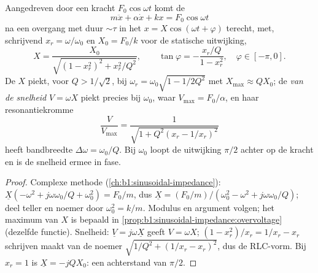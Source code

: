 \begin{theorem}\label{thm:b1:oscillators-resonance:forced}
Aangedreven door een kracht $F_0\cos\omega t$ komt de 
\[
m\ddot x + \alpha\dot x + kx = F_0\cos\omega t
\]
na een overgang met duur $\sim\tau$ in het  $x = X\cos(\omega t + \varphi)$ terecht, met, schrijvend $x_r = \omega/\omega_0$
en $X_0 = F_0/k$ voor de statische uitwijking,
\[
X = \frac{X_0}{\sqrt{(1 - x_r^2)^2 + x_r^2/Q^2}}, \qquad
\tan\varphi = -\frac{x_r/Q}{1 - x_r^2}, \quad \varphi \in [-\pi, 0] .
\]
De \emph{} $X$ piekt, voor $Q > 1/\sqrt2$, bij $\omega_r =
\omega_0\sqrt{1 - 1/2Q^2}$ met $X_{\max} \approx QX_0$; de \emph{ van de
snelheid} $V = \omega X$ piekt precies bij $\omega_0$, waar $V_{\max} =
F_0/\alpha$, en haar resonantiekromme
\[
\frac{V}{V_{\max}} = \frac{1}{\sqrt{1 + Q^2(x_r - 1/x_r)^2}}
\]
heeft bandbreedte $\Delta\omega = \omega_0/Q$. Bij $\omega_0$ loopt de uitwijking
$\pi/2$ achter op de kracht en is de snelheid ermee in fase.
\end{theorem}

\begin{proof}
Complexe methode (\cref{ch:b1:sinusoidal-impedance}): $\underline X(-\omega^2
+ j\omega\omega_0/Q + \omega_0^2) = F_0/m$, dus $\underline X = (F_0/m)/(\omega_0^2
- \omega^2 + j\omega\omega_0/Q)$; deel teller en noemer door
$\omega_0^2 = k/m$. Modulus en argument volgen; het maximum van $X$ is
bepaald in \cref{prop:b1:sinusoidal-impedance:overvoltage} (dezelfde
functie). Snelheid: $\underline V = j\omega\underline X$ geeft $V = \omega X$;
$(1 - x_r^2)/x_r = 1/x_r - x_r$ schrijven maakt van de noemer
$\sqrt{1/Q^2 + (1/x_r - x_r)^2}$, dus de RLC-vorm. Bij $x_r = 1$ is
$\underline X = -jQX_0$: een achterstand van $\pi/2$.
\end{proof}

